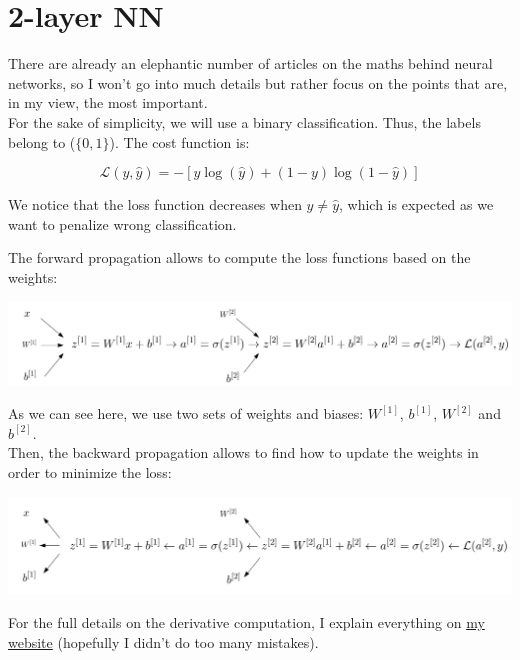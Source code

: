 \section{2-layer NN}

There are already an elephantic number of articles on the maths behind neural networks, so I won't go into much details but rather focus on the points that are, in my view, the most important. \\

For the sake of simplicity, we will use a binary classification. Thus, the labels belong to ($\{0,1\}$). The cost function is:

$$\mathcal{L}(y, \widehat{y})=-[y\log(\widehat{y})+(1-y)\log(1-\widehat{y})]$$

We notice that the loss function decreases when $y \neq \widehat y$, which is expected as we want to penalize wrong classification.

The forward propagation allows to compute the loss functions based on the weights:

\begin{center}
\includegraphics[scale=0.3]{img/NN_2.png}
\end{center}

As we can see here, we use two sets of weights and biases: $W^{[1]}$, $b^{[1]}$, $W^{[2]}$ and $b^{[2]}$. \\

Then, the backward propagation allows to find how to update the weights in order to minimize the loss:

\begin{center}
\includegraphics[scale=0.3]{img/NN_2_backward.png}
\end{center}

For the full details on the derivative computation, I explain everything on \href{https://savoga.github.io/machinelearning/neural-network/}{my website} (hopefully I didn't do too many mistakes).